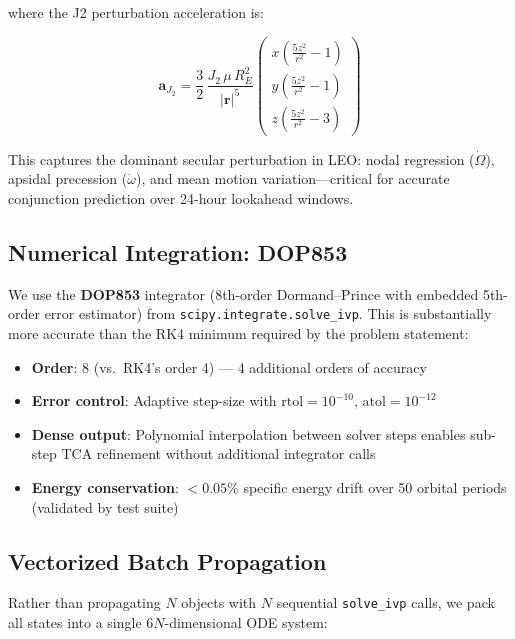 \documentclass[11pt,a4paper]{article}
\begin{document}
where the J2 perturbation acceleration is:

\begin{equation}
\mathbf{a}_{J_2} = \frac{3}{2}\,\frac{J_2\,\mu\,R_E^2}{|\mathbf{r}|^5}
\begin{pmatrix}
x\left(\frac{5z^2}{r^2} - 1\right) \\[4pt]
y\left(\frac{5z^2}{r^2} - 1\right) \\[4pt]
z\left(\frac{5z^2}{r^2} - 3\right)
\end{pmatrix}
\end{equation}

This captures the dominant secular perturbation in LEO: nodal regression
($\dot{\Omega}$), apsidal precession ($\dot{\omega}$), and mean motion
variation---critical for accurate conjunction prediction over 24-hour
lookahead windows.

\subsection{Numerical Integration: DOP853}

We use the \textbf{DOP853} integrator (8th-order Dormand--Prince with
embedded 5th-order error estimator) from \texttt{scipy.integrate.solve\_ivp}.
This is substantially more accurate than the RK4 minimum required by the
problem statement:

\begin{itemize}[nosep]
  \item \textbf{Order}: 8 (vs.\ RK4's order 4) --- 4 additional orders of accuracy
  \item \textbf{Error control}: Adaptive step-size with $\text{rtol} = 10^{-10}$, $\text{atol} = 10^{-12}$
  \item \textbf{Dense output}: Polynomial interpolation between solver steps enables
        sub-step TCA refinement without additional integrator calls
  \item \textbf{Energy conservation}: $< 0.05\%$ specific energy drift over 50 orbital
        periods (validated by test suite)
\end{itemize}

\subsection{Vectorized Batch Propagation}

Rather than propagating $N$ objects with $N$ sequential \texttt{solve\_ivp}
calls, we pack all states into a single $6N$-dimensional ODE system:
\end{document}
